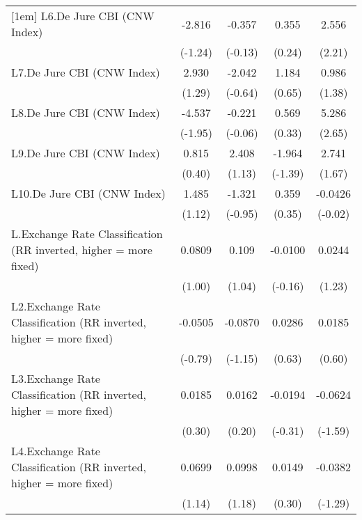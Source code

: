 {\begin{tabular}{l*{4}{c}}
[1em]
L6.De Jure CBI (CNW Index)&   -2.816         &   -0.357         &    0.355         &    2.556\sym{*}  \\
                &  (-1.24)         &  (-0.13)         &   (0.24)         &   (2.21)         \\
[1em]
L7.De Jure CBI (CNW Index)&    2.930         &   -2.042         &    1.184         &    0.986         \\
                &   (1.29)         &  (-0.64)         &   (0.65)         &   (1.38)         \\
[1em]
L8.De Jure CBI (CNW Index)&   -4.537         &   -0.221         &    0.569         &    5.286\sym{**} \\
                &  (-1.95)         &  (-0.06)         &   (0.33)         &   (2.65)         \\
[1em]
L9.De Jure CBI (CNW Index)&    0.815         &    2.408         &   -1.964         &    2.741         \\
                &   (0.40)         &   (1.13)         &  (-1.39)         &   (1.67)         \\
[1em]
L10.De Jure CBI (CNW Index)&    1.485         &   -1.321         &    0.359         &  -0.0426         \\
                &   (1.12)         &  (-0.95)         &   (0.35)         &  (-0.02)         \\
[1em]
L.Exchange Rate Classification (RR inverted, higher = more fixed)&   0.0809         &    0.109         &  -0.0100         &   0.0244         \\
                &   (1.00)         &   (1.04)         &  (-0.16)         &   (1.23)         \\
[1em]
L2.Exchange Rate Classification (RR inverted, higher = more fixed)&  -0.0505         &  -0.0870         &   0.0286         &   0.0185         \\
                &  (-0.79)         &  (-1.15)         &   (0.63)         &   (0.60)         \\
[1em]
L3.Exchange Rate Classification (RR inverted, higher = more fixed)&   0.0185         &   0.0162         &  -0.0194         &  -0.0624         \\
                &   (0.30)         &   (0.20)         &  (-0.31)         &  (-1.59)         \\
[1em]
L4.Exchange Rate Classification (RR inverted, higher = more fixed)&   0.0699         &   0.0998         &   0.0149         &  -0.0382         \\
                &   (1.14)         &   (1.18)         &   (0.30)         &  (-1.29)         \\

\end{tabular}}
